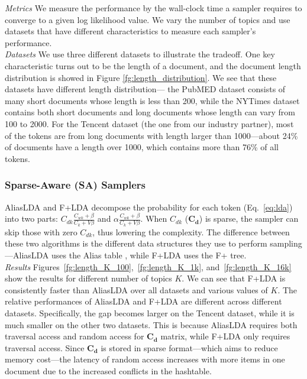 \documentclass[10pt,journal,cspaper,compsoc]{IEEEtran}
\begin{document}
    \noindent
	{\large \em Metrics} We measure the performance by the wall-clock time a sampler requires to converge to a given log likelihood value.
	We vary the number of topics and use datasets that have different
	characteristics to measure each sampler's
	performance.
	\\

    \noindent
	{\large \em Datasets} We use three different datasets to illustrate the tradeoff.
	One key characteristic turns out to
	be the length of a document, and the
	document length distribution is showed in Figure \ref{fg:length_distribution}.
	We see that these datasets have
	different length distribution---
	the PubMED dataset consists of
	many short documents whose length is less than 200, while the NYTimes dataset contains both short documents and long documents whose length can vary from 100 to 2000.
	For the Tencent dataset (the one from
	our industry partner), most of the tokens
	are from long documents with length larger than 1000---about 24\% of documents have a length over 1000, which contains more than 76\% of all tokens.
	

	\subsubsection{Sparse-Aware (SA) Samplers}
	
	AliasLDA and F+LDA decompose the
	probability for each token (Eq.~\ref{eq:lda}) into two parts: $C_{dk} \frac{C_{wk} + \beta}{C_k + V\beta}$ and $\alpha \frac{C_{wk} + \beta}{C_k + V\beta}$. When $C_{dk}$ ($\mathbf{C_{d}}$)
	is sparse, the sampler
	can skip those with zero $C_{dk}$, thus
	lowering the complexity.
	The difference between these two algorithms
	is the different data structures they use
	to perform sampling---AliasLDA uses the Alias table \cite{walker1977efficient}, while F+LDA uses the F+ tree.
	\\

    \noindent
	{\large \em Results}
	Figures~\ref{fg:length_K_100},~\ref{fg:length_K_1k}, and~\ref{fg:length_K_16k} show the results
	for different number of topics $K$.
	We can see that F+LDA is consistently faster than AliasLDA over all datasets and various values of $K$.
	The relative performances of AliasLDA and F+LDA are different across different datasets.
	Specifically, the gap becomes larger on the Tencent dataset, while it is much smaller
	on the other two datasets.
	This is because AliasLDA requires both traversal access and random access for $\mathbf{C_d}$ matrix, while F+LDA only requires traversal access. Since $\mathbf{C_d}$ is stored in sparse format---which aims to reduce memory cost---the latency of random access increases with more items in one document due to the increased conflicts in the hashtable.
	
\end{document}
